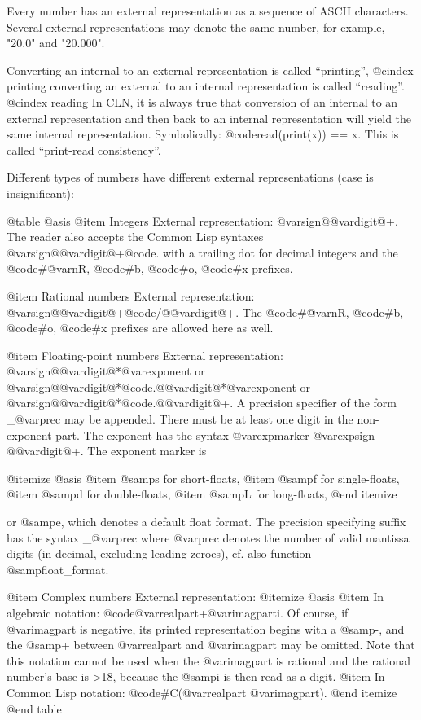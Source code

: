 Every number has an external representation as a sequence of ASCII characters.
Several external representations may denote the same number, for example,
"20.0" and "20.000".

Converting an internal to an external representation is called ``printing'',
@cindex printing
converting an external to an internal representation is called ``reading''.
@cindex reading
In CLN, it is always true that conversion of an internal to an external
representation and then back to an internal representation will yield the
same internal representation. Symbolically: @code{read(print(x)) == x}.
This is called ``print-read consistency''. 

Different types of numbers have different external representations (case
is insignificant):

@table @asis
@item Integers
External representation: @var{sign}@{@var{digit}@}+. The reader also accepts the
Common Lisp syntaxes @var{sign}@{@var{digit}@}+@code{.} with a trailing dot
for decimal integers
and the @code{#@var{n}R}, @code{#b}, @code{#o}, @code{#x} prefixes.

@item Rational numbers
External representation: @var{sign}@{@var{digit}@}+@code{/}@{@var{digit}@}+.
The @code{#@var{n}R}, @code{#b}, @code{#o}, @code{#x} prefixes are allowed
here as well.

@item Floating-point numbers
External representation: @var{sign}@{@var{digit}@}*@var{exponent} or
@var{sign}@{@var{digit}@}*@code{.}@{@var{digit}@}*@var{exponent} or
@var{sign}@{@var{digit}@}*@code{.}@{@var{digit}@}+. A precision specifier
of the form _@var{prec} may be appended. There must be at least
one digit in the non-exponent part. The exponent has the syntax
@var{expmarker} @var{expsign} @{@var{digit}@}+.
The exponent marker is

@itemize @asis
@item
@samp{s} for short-floats,
@item
@samp{f} for single-floats,
@item
@samp{d} for double-floats,
@item
@samp{L} for long-floats,
@end itemize

or @samp{e}, which denotes a default float format. The precision specifying
suffix has the syntax _@var{prec} where @var{prec} denotes the number of
valid mantissa digits (in decimal, excluding leading zeroes), cf. also
function @samp{float_format}.

@item Complex numbers
External representation:
@itemize @asis
@item
In algebraic notation: @code{@var{realpart}+@var{imagpart}i}. Of course,
if @var{imagpart} is negative, its printed representation begins with
a @samp{-}, and the @samp{+} between @var{realpart} and @var{imagpart}
may be omitted. Note that this notation cannot be used when the @var{imagpart}
is rational and the rational number's base is >18, because the @samp{i}
is then read as a digit.
@item
In Common Lisp notation: @code{#C(@var{realpart} @var{imagpart})}.
@end itemize
@end table


